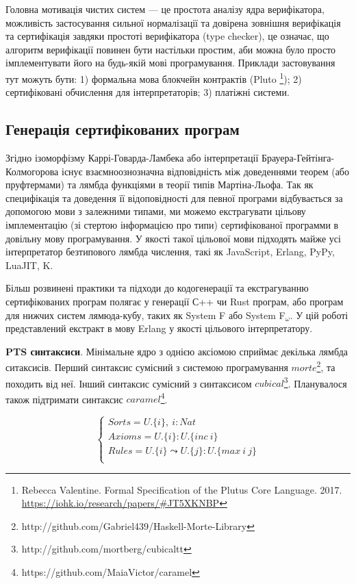 Головна мотивація чистих систем --- це простота аналізу ядра верифікатора,
можливість застосування сильної нормалізації та довірена зовнішня верифікація
та сертифікація завдяки простоті верифікатора (type checker), це означає, що
алгоритм верифікації повинен бути настільки простим, аби можна було
просто імплементувати його на будь-якій мові програмування. Приклади застовування
тут можуть бути:
1) формальна мова блокчейн контрактів (Pluto
   \footnote{Rebecca Valentine. Formal Specification of the Plutus Core Language. 2017.
             \url{https://iohk.io/research/papers/#JT5XKNBP}});
2) сертифіковані обчислення для інтерпретаторів;
3) платіжні системи.

\subsection{Генерація сертифікованих програм}
Згідно ізоморфізму Каррі-Говарда-Ламбека або інтерпретації Брауера-Гейтінга-Колмогорова
існує взаємноознозначна відповідність між доведеннями теорем (або пруфтермами)
та лямбда функціями в теорії типів Мартіна-Льофа\cite{Lof84}.
Так як специфікація та доведення її відоповідності для певної програми
відбувається за допомогою мови з залежними типами, ми можемо екстрагувати
цільову імплементацію (зі стертою інформацією про типи) сертифікованої программи
в довільну мову програмування. У якості такої цільової мови підходять
майже усі інтерпретатор безтипового лямбда числення, такі як JavaScript,
Erlang, PyPy, LuaJIT, K.

Більш розвинені практики та підходи до кодогенерації та екстрагуванню
сертифікованих програм полягає у генерації С++ чи Rust програм, або програм
для нижчих систем лямюда-кубу, таких як System F або System F$_\omega$.
У цій роботі представлений екстракт в мову Erlang у якості цільового інтерпретатору.

\textbf{PTS синтаксиси}. Мінімальне ядро з однією аксіомою
сприймає декілька лямбда ситаксисів.
Перший синтаксис сумісний з системою програмування
$morte$\footnote{http://github.com/Gabriel439/Haskell-Morte-Library}, та походить від неї.
Інший синтаксис сумісний з синтаксисом $cubical$\footnote{http://github.com/mortberg/cubicaltt}.
Планувалося також підтримати синтаксис $caramel$\footnote{https://github.com/MaiaVictor/caramel}.

\begin{equation}
\begin{cases}
Sorts = U.\{i\},\ i : Nat\\
Axioms = U.\{i\} : U.\{inc\ i\}\\
Rules = U.\{i\} \leadsto U.\{j\} : U.\{max\ i\ j\}\\
\end{cases}
\end{equation}

